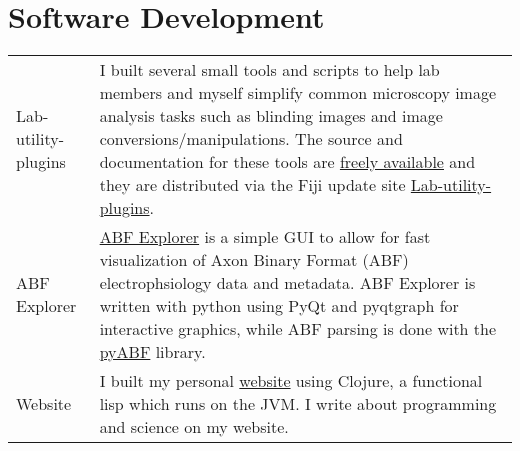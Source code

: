 \documentclass[11pt]{article}
\begin{document}
\section*{Software Development}
\label{sec:orgb765ce5}
\begin{tabular}{lp{}}
Lab-utility-plugins& I built several small tools and scripts to help lab members and myself simplify common microscopy image analysis tasks such as blinding images and image conversions/manipulations. The source and documentation for these tools are \href{https://github.com/Macklin-Lab/imagej-microscopy-scripts}{freely available} and they are distributed via the Fiji update site \href{https://imagej.github.io/list-of-update-sites/}{Lab-utility-plugins}.\\
ABF Explorer& \href{https://github.com/nkicg6/ABF_Explorer}{ABF Explorer} is a simple GUI to allow for fast visualization of Axon Binary Format (ABF) electrophsiology data and metadata. ABF Explorer is written with python using PyQt and pyqtgraph for interactive graphics, while ABF parsing is done with the \href{https://github.com/swharden/pyABF}{pyABF} library.\\
Website& I built my personal \href{https://nickgeorge.net}{website} using Clojure, a functional lisp which runs on the JVM. I write about programming and science on my website.\\

\end{tabular}
\end{document}
